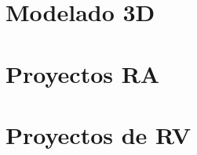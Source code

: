 \documentclass[aspectratio=169,compress]{beamer}
\begin{document}











\section{Modelado 3D}













%

\section{Proyectos RA}








%

%

%


\section{Proyectos de RV}
\end{document}
